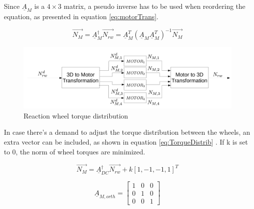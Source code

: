 Since $\underline{A}_{M} $ is a $ 4 \times 3 $ matrix, a pseudo inverse has to be used when reordering the equation, as presented in equation \ref{eq:motorTrans}. 

\begin{equation}
\label{eq:motorTrans}
\vec{N_{M}} =  \underline{A}_{M} ^\dagger \vec{N_{rw}}   =  \underline{A}_{M}^T  (\underline{A}_{M} \underline{A}_{M} ^T)^{-1} \vec{N_{M}}
\end{equation}

\begin{figure}[H]
	\centering 
	\includegraphics[width=170mm]{figures/distribution}	
	\caption{Reaction wheel torque distribution}
	\label{fig:torqueDistribution}
\end{figure}



In case there's a demand to adjust the torque distribution between the wheels, an extra vector can be included, as shown in equation \ref{eq:TorqueDistrib}
\cite[equation 18.41-42]{SADC}. If k is set to 0, the norm of wheel torques are minimized.

\begin{equation}
\label{eq:TorqueDistrib}
 \vec{N_{M}} = \underline{A}^\dagger_{DC} \vec{N_{rw}}  + k\left[1,-1,-1,1\right]^T
\end{equation}


\begin{equation}
\underline{A}_{M,orth}  = 
\begin{bmatrix}
1       & 0  &  0 \\
0       & 1  &  0  \\
0       & 0   & 1
\end{bmatrix} 
\label{eq:orthoMatrix}
\end{equation}
